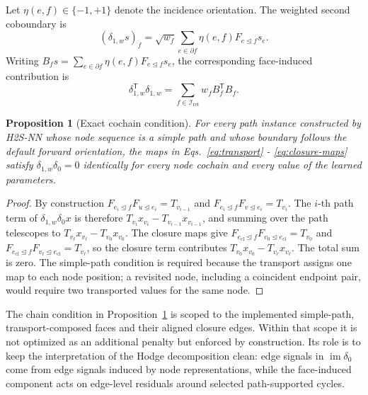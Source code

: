 \documentclass[sigconf,anonymous,review]{acmart}
\newcommand{\method}{\textsc{H2S-NN}}
\newcommand{\transpose}{\mathsf{T}}
\newtheorem{proposition}{Proposition}
\begin{document}
Let \(\eta(e,f)\in\{-1,+1\}\) denote the incidence orientation. The weighted second coboundary is
\begin{equation}
  (\delta_{1,w}s)_f
  =
  \sqrt{w_f}
  \sum_{e\in\partial f}
    \eta(e,f)F_{e\unlhd f}s_e .
  \label{eq:delta1}
\end{equation}
Writing
\(B_fs=\sum_{e\in\partial f}\eta(e,f)F_{e\unlhd f}s_e\),
the corresponding face-induced contribution is
\begin{equation}
  \delta_{1,w}^{\transpose}\delta_{1,w}
  =
  \sum_{f\in\mathcal{I}_{\mathrm{ret}}}
    w_f B_f^{\transpose}B_f .
  \label{eq:weighted-up}
\end{equation}

\begin{proposition}[Exact cochain condition]
\label{prop:chain}
For every path instance constructed by \method{} whose node sequence is a
simple path and whose boundary follows the default forward orientation, the
maps in
Eqs.~\eqref{eq:transport} - \eqref{eq:closure-maps} satisfy
\(\delta_{1,w}\delta_0=0\) identically for every node cochain and every value
of the learned parameters.
\end{proposition}
\begin{proof}
By construction \(F_{e_i\unlhd f}F_{u\unlhd e_i}=T_{v_{i-1}}\) and
\(F_{e_i\unlhd f}F_{v\unlhd e_i}=T_{v_i}\).  The \(i\)-th path term of
\(\delta_{1,w}\delta_0x\) is therefore
\(T_{v_i}x_{v_i}-T_{v_{i-1}}x_{v_{i-1}}\), and summing over the path telescopes to
\(T_{v_\ell}x_{v_\ell}-T_{v_0}x_{v_0}\).  The closure maps give
\(F_{e_{\mathrm{cl}}\unlhd f}F_{v_0\unlhd e_{\mathrm{cl}}}=T_{v_0}\) and
\(F_{e_{\mathrm{cl}}\unlhd f}F_{v_\ell\unlhd e_{\mathrm{cl}}}=T_{v_\ell}\), so the closure term
contributes \(T_{v_0}x_{v_0}-T_{v_\ell}x_{v_\ell}\).  The total sum is zero.  The simple-path
condition is required because the transport assigns one map to each node position; a revisited node,
including a coincident endpoint pair, would require two transported values for the same node.
\end{proof}
The chain condition in Proposition~\ref{prop:chain} is scoped to the implemented simple-path,
transport-composed faces and their aligned closure edges.  Within that scope it is
not optimized as an additional penalty but enforced by construction. Its role is to keep
the interpretation of the Hodge decomposition clean: edge signals in \(\operatorname{im}\delta_0\)
come from edge signals induced by node representations, while the face-induced component acts on edge-level residuals around selected
path-supported cycles.
\end{document}
